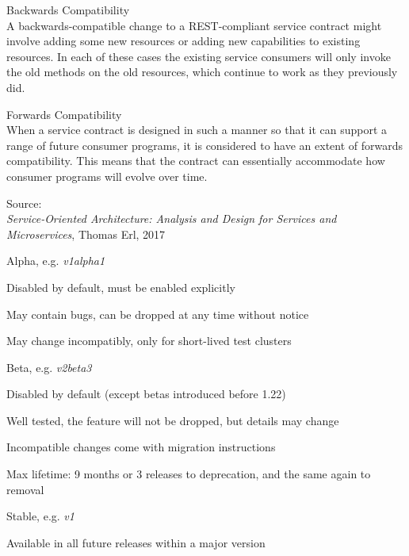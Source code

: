 \documentclass[Screen16to9,17pt]{foils}
\begin{document}

\begin{list2}
\item Backwards Compatibility\\
A backwards-compatible change to a REST-compliant service contract might involve adding some new resources or adding new capabilities to existing resources. In each of these cases the existing service consumers will only invoke the old methods on the old resources, which continue to work as they previously did.
\item Forwards Compatibility\\
When a service contract is designed in such a manner so that it can support a range of future consumer programs, it is considered to have an extent of forwards compatibility. This means that the contract can essentially accommodate how consumer programs will evolve over time.
\end{list2}

Source: {\footnotesize\\
\emph{Service‑Oriented Architecture: Analysis and Design for Services and Microservices}, Thomas Erl, 2017}




\begin{list1}
\item Alpha, e.g. \emph{v1alpha1}
\begin{list2}
\item Disabled by default, must be enabled explicitly
\item May contain bugs, can be dropped at any time without notice
\item May change incompatibly, only for short-lived test clusters
\end{list2}
\item Beta, e.g. \emph{v2beta3}
\begin{list2}
\item Disabled by default (except betas introduced before 1.22)
\item Well tested, the feature will not be dropped, but details may change
\item Incompatible changes come with migration instructions
\item Max lifetime: 9 months or 3 releases to deprecation, and the same again to removal
\end{list2}
\item Stable, e.g. \emph{v1}
\begin{list2}
\item Available in all future releases within a major version
\end{list2}
\end{list1}
\end{document}
